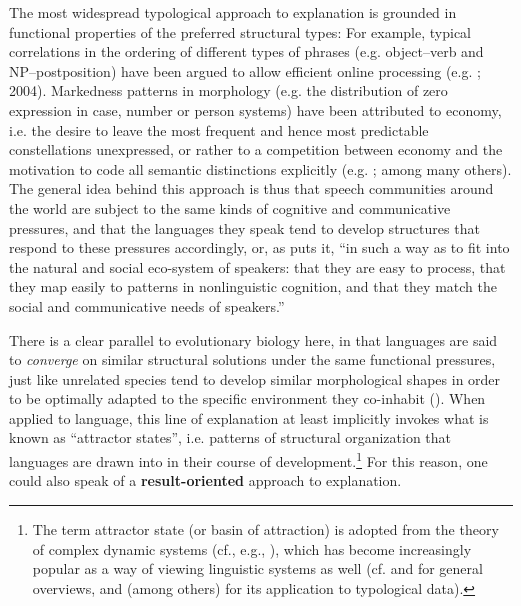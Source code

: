 \documentclass[output=paper]{langsci/langscibook}
\begin{document}
The most widespread typological approach to explanation is grounded in functional properties of the preferred structural types: For example, typical correlations in the ordering of different types of phrases (e.g. object–verb and NP–postposition) have been argued to allow efficient online processing (e.g. \citealt{Hawkins1994}; 2004). Markedness patterns in morphology (e.g. the distribution of zero expression in case, number or person systems) have been attributed to economy, i.e. the desire to leave the most frequent and hence most predictable constellations unexpressed, or rather to a competition between economy and the motivation to code all semantic distinctions explicitly (e.g. \citealt{Haiman1983,Comrie1989,Aissen2003,Croft2003,Haspelmath2008}; among many others). The general idea behind this approach is thus that speech communities around the world are subject to the same kinds of cognitive and communicative pressures, and that the languages they speak tend to develop structures that respond to these pressures accordingly, or, as \citet[118]{Bickel2014} puts it, “in such a way as to fit into the natural and social eco-system of speakers: that they are easy to process, that they map easily to patterns in nonlinguistic cognition, and that they match the social and communicative needs of speakers.” 

There is a clear parallel to evolutionary biology here, in that languages are said to \textit{converge} on similar structural solutions under the same functional pressures, just like unrelated species tend to develop similar morphological shapes in order to be optimally adapted to the specific environment they co-inhabit (\citealt{Deacon1997,Caldwell2008,EvansLevinson2009,Givón2010}). When applied to language, this line of explanation at least implicitly invokes what is known as “attractor states”, i.e. patterns of structural organization that languages are drawn into in their course of development.\footnote{The term attractor state (or basin of attraction) is adopted from the theory of complex dynamic systems (cf., e.g., \citealt{Cooper1999,HoweLewis2005,Holland2006}), which has become increasingly popular as a way of viewing linguistic systems as well (cf. \citealt{BecknerEtAl2009} and \citealt{Port2009} for general overviews, and \citealt{Haig2018} (among others) for its application to typological data).} For this reason, one could also speak of a \textbf{result-oriented} approach to explanation. 
\end{document}
